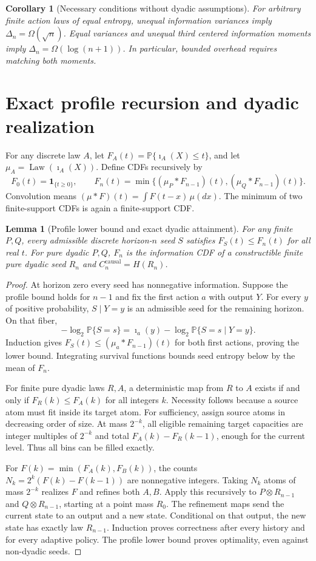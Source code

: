 \documentclass[11pt,a4paper]{article}
\newtheorem{lemma}[theorem]{Lemma}
\newtheorem{corollary}[theorem]{Corollary}
\newcommand{\Prb}{\mathbb P}
\newcommand{\Law}{\operatorname{Law}}
\newcommand{\ii}{\imath}
\begin{document}
\begin{corollary}[Necessary conditions without dyadic assumptions]
\label{cor:general}
For arbitrary finite action laws of equal entropy, unequal information
variances imply $\Delta_n=\Omega(\sqrt n)$. Equal variances and unequal
third centered information moments imply $\Delta_n=\Omega(\log(n+1))$.
In particular, bounded overhead requires matching both moments.
\end{corollary}

\section{Exact profile recursion and dyadic realization}
For any discrete law $A$, let $F_A(t)=\Prb\{\ii_A(X)\le t\}$, and let
$\mu_A=\Law(\ii_A(X))$. Define CDFs recursively by
\begin{equation}\label{eq:F}
F_0(t)=\mathbf1_{\{t\ge0\}},\qquad
F_n(t)=\min\{(\mu_P*F_{n-1})(t),(\mu_Q*F_{n-1})(t)\}.
\end{equation}
Convolution means $(\mu*F)(t)=\int F(t-x)\,\mu(dx)$.
The minimum of two finite-support CDFs is again a finite-support CDF.

\begin{lemma}[Profile lower bound and exact dyadic attainment]\label{lem:optimal}
For any finite $P,Q$, every admissible discrete horizon-$n$ seed $S$
satisfies $F_S(t)\le F_n(t)$ for all real $t$.
For pure dyadic $P,Q$, $F_n$ is the information CDF of a constructible
finite pure dyadic seed $R_n$ and
$C_n^{\mathrm{causal}}=H(R_n)$.
\end{lemma}
\begin{proof}
At horizon zero every seed has nonnegative information. Suppose the
profile bound holds for $n-1$ and fix the first action $a$ with output $Y$.
For every $y$ of positive probability, $S\mid Y=y$ is an admissible seed
for the remaining horizon. On that fiber,
\[
-\log_2\Prb\{S=s\}=
\ii_a(y)-\log_2\Prb\{S=s\mid Y=y\}.
\]
Induction gives $F_S(t)\le(\mu_a*F_{n-1})(t)$ for both first actions,
proving the lower bound. Integrating survival functions bounds seed
entropy below by the mean of $F_n$.

For finite pure dyadic laws $R,A$, a deterministic map from $R$ to $A$
exists if and only if $F_R(k)\le F_A(k)$ for all integers $k$.
Necessity follows because a source atom must fit inside its target atom.
For sufficiency, assign source atoms in decreasing order of size. At
mass $2^{-k}$, all eligible remaining target capacities are integer
multiples of $2^{-k}$ and total $F_A(k)-F_R(k-1)$, enough for the current
level. Thus all bins can be filled exactly.

For $F(k)=\min(F_A(k),F_B(k))$, the counts
$N_k=2^k(F(k)-F(k-1))$ are nonnegative integers. Taking $N_k$ atoms of
mass $2^{-k}$ realizes $F$ and refines both $A,B$.
Apply this recursively to $P\otimes R_{n-1}$ and $Q\otimes R_{n-1}$,
starting at a point mass $R_0$. The refinement maps send the current
state to an output and a new state. Conditional on that output, the new
state has exactly law $R_{n-1}$. Induction proves correctness after every
history and for every adaptive policy. The profile lower bound proves
optimality, even against non-dyadic seeds.
\end{proof}
\end{document}
